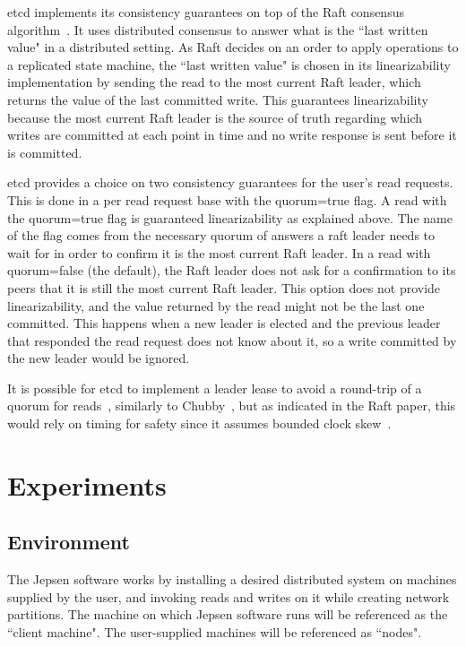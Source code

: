 \documentclass[12pt,conference]{IEEEtran}
\begin{document}
etcd implements its consistency guarantees on top of the Raft consensus algorithm~\cite{ongaro2014search,etcdGithubWebsite}. It uses distributed consensus to answer what is the ``last written value" in a distributed setting. As Raft decides on an order to apply operations to a replicated state machine, the ``last written value" is chosen in its linearizability implementation by sending the read to the most current Raft leader, which returns the value of the last committed write. This guarantees linearizability because the most current Raft leader is the source of truth regarding which writes are committed at each point in time and no write response is sent before it is committed. 

etcd provides a choice on two consistency guarantees for the user's read requests. This is done in a per read request base with the quorum=true flag. A read with the quorum=true flag is guaranteed linearizability as explained above. The name of the flag comes from the necessary quorum of answers a raft leader needs to wait for in order to confirm it is the most current Raft leader. In a read with quorum=false (the default), the Raft leader does not ask for a confirmation to its peers that it is still the most current Raft leader. This option does not provide linearizability, and the value returned by the read might not be the last one committed. This happens when a new leader is elected and the previous leader that responded the read request does not know about it, so a write committed by the new leader would be ignored. 

It is possible for etcd to implement a leader lease to avoid a round-trip of a quorum for reads~\cite{gray1989leases}, similarly to Chubby~\cite{burrows2006chubby}, but as indicated in the Raft paper, this would rely on timing for safety since it assumes bounded clock skew~\cite{ongaro2014search}.

\section{Experiments}
\subsection {Environment}

The Jepsen software works by installing a desired distributed system on machines supplied by the user, and invoking reads and writes on it while creating network partitions. The machine on which Jepsen software runs will be referenced as the ``client machine". The user-supplied machines will be referenced as ``nodes".
\end{document}
